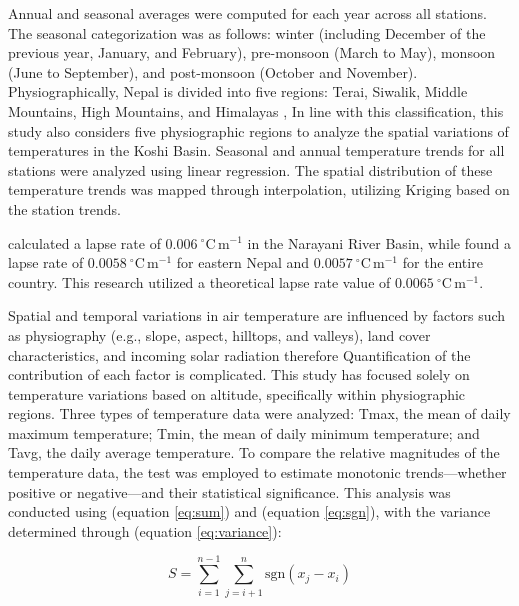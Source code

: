Annual and seasonal averages were computed for each year across all stations. The seasonal categorization was as follows: winter (including December of the previous year, January, and February), pre-monsoon (March to May), monsoon (June to September), and post-monsoon (October and November). Physiographically, Nepal is divided into five regions: Terai, Siwalik, Middle Mountains, High Mountains, and Himalayas \parencite{nayava_spatial_2017}, In line with this classification, this study also considers five physiographic regions to analyze the spatial variations of temperatures in the Koshi Basin. Seasonal and annual temperature trends for all stations were analyzed using linear regression. The spatial distribution of these temperature trends was mapped through interpolation, utilizing Kriging based on the station trends.

\textcite{chand_trend_2019} calculated a lapse rate of \(0.006 \ ^\circ \mathrm{C} \, \mathrm{m}^{-1}\) in the Narayani River Basin, while \textcite{nayava_spatial_2017} found a lapse rate of \(0.0058 \ ^\circ \mathrm{C} \, \mathrm{m}^{-1}\) for eastern Nepal and \(0.0057 \ ^\circ \mathrm{C} \, \mathrm{m}^{-1}\) for the entire country. This research utilized a theoretical lapse rate value of \(0.0065 \ ^\circ \mathrm{C} \, \mathrm{m}^{-1}\).

Spatial and temporal variations in air temperature are influenced by factors such as physiography (e.g., slope, aspect, hilltops, and valleys), land cover characteristics, and incoming solar radiation therefore Quantification of the contribution of each factor is complicated. This study has focused solely on temperature variations based on altitude, specifically within physiographic regions. Three types of temperature data were analyzed: Tmax, the mean of daily maximum temperature; Tmin, the mean of daily minimum temperature; and Tavg, the daily average temperature. To compare the relative magnitudes of the temperature data, the \textcite{mann_nonparametric_1945,kendall_rank_1949} test was employed to estimate monotonic trends—whether positive or negative—and their statistical significance. This analysis was conducted using (equation \ref{eq:sum})  and (equation \ref{eq:sgn}), with the variance determined through (equation \ref{eq:variance}):

\begin{equation} 
  S = \sum_{i=1}^{n-1} \sum_{j=i+1}^{n} \text{sgn}(x_j - x_i) \tag{1} 
  \label{eq:sum}
  \end{equation}
  
